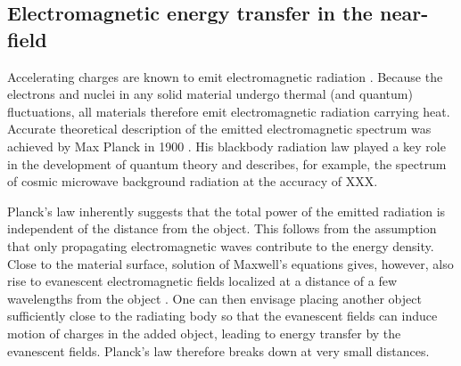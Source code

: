 

\subsection{Electromagnetic energy transfer in the near-field}
\label{sec:intro_em}
Accelerating charges are known to emit electromagnetic radiation \cite{jackson}. Because the electrons and nuclei in any solid material undergo thermal (and quantum) fluctuations, all materials therefore emit electromagnetic radiation carrying heat. Accurate theoretical description of the emitted electromagnetic spectrum was achieved by Max Planck in 1900 \cite{planck00a}. His blackbody radiation law played a key role in the development of quantum theory and describes, for example, the spectrum of cosmic microwave background radiation at the accuracy of XXX.


% 

Planck's law inherently suggests that the total power of the emitted radiation is independent of the distance from the object. This follows from the assumption that only propagating electromagnetic waves contribute to the energy density. Close to the material surface, solution of Maxwell's equations gives, however, also rise to evanescent electromagnetic fields localized at a distance of a few wavelengths from the object \cite{polder71}. One can then envisage placing another object sufficiently close to the radiating body so that the evanescent fields can induce motion of charges in the added object, leading to energy transfer by the evanescent fields. Planck's law therefore breaks down at very small distances. 

